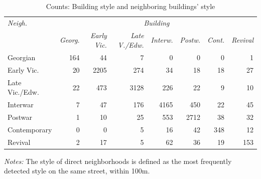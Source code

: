 \documentclass[]{article}
\begin{document}
\begin{table}[ht]
\caption{Counts: Building style and neighboring buildings' style}
\label{tab:vintneigh}
\centering
\begin{tabular}{lrrrrrrr}
\toprule
\emph{Neigh.} & \multicolumn{7}{c}{\emph{Building}} \\
 \cmidrule(lr){1-1}
 \cmidrule(lr){2-8}
& \emph{Georg.} & \emph{Early Vic.} & \emph{Late V./Edw.} & \emph{Interw.} & \emph{Postw.} & \emph{Cont.} & \emph{Revival} \\ 
  \cmidrule(lr){2-8}
Georgian & 164 &  44 &   7 &   0 &   0 &   0 &   1 \\ 
  Early Vic. &  20 & 2205 & 274 &  34 &  18 &  18 &  27 \\ 
  Late Vic./Edw. &  22 & 473 & 3128 & 226 &  22 &   9 &  10 \\ 
  Interwar &   7 &  47 & 176 & 4165 & 450 &  22 &  45 \\ 
  Postwar &   1 &  10 &  25 & 553 & 2712 &  38 &  32 \\ 
  Contemporary &   0 &   0 &   5 &  16 &  42 & 348 &  12 \\ 
  Revival &   2 &  17 &   5 &  62 &  36 &  19 & 153 \\ 
   \bottomrule
\end{tabular}
\begin{minipage}{\textwidth}
\vspace{0.25cm}
\footnotesize \emph{Notes:} The style of direct neighborhoods is defined as the most frequently detected style on the same street, within 100m. 
\end{minipage}
\end{table}

\newpage
\end{document}
